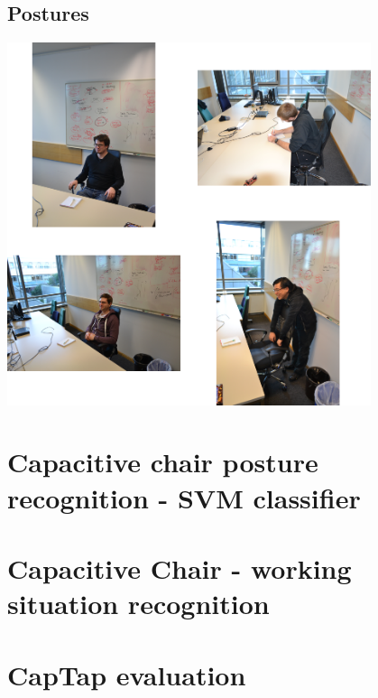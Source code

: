 \subsection{Postures}
\begin{minipage}{\linewidth}
\centering
\includegraphics[width=0.8\textwidth]{images/app_eval_chair1}
\label{fig:disc_unob_elec}
\end{minipage}

\section{Capacitive chair posture recognition - SVM classifier}

\section{Capacitive Chair - working situation recognition}

\section{CapTap evaluation}
